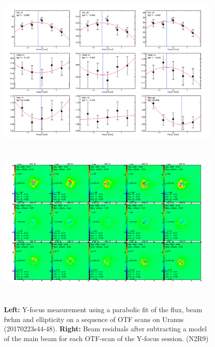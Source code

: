 \begin{figure}[h!]
\centering
\includegraphics[height=8cm]{Figures/plot_20170223s44.png}
\hspace{0.5cm}
\includegraphics[height=8cm]{Figures/residuals_focus_otf_20170223s44.png}
\caption[Lateral Y focus measures]{\textbf{Left:} Y-focus measurement using a
    parabolic fit of the flux, beam fwhm and ellipticity on a sequence
    of OTF scans on Uranus (20170223s44-48). \textbf{Right:} Beam residuals
    after subtracting a model of the main beam for each OTF-scan of the Y-focus
    session. (N2R9)}
\label{fig:Y_focus}
\end{figure}

